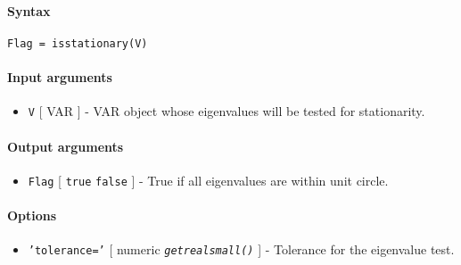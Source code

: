 


	\paragraph{Syntax}

\begin{verbatim}
Flag = isstationary(V)
\end{verbatim}

\paragraph{Input arguments}

\begin{itemize}
\itemsep1pt\parskip0pt
\item
  \texttt{V} {[} VAR {]} - VAR object whose eigenvalues will be tested
  for stationarity.
\end{itemize}

\paragraph{Output arguments}

\begin{itemize}
\itemsep1pt\parskip0pt
\item
  \texttt{Flag} {[} \texttt{true} \textbar{} \texttt{false} {]} - True
  if all eigenvalues are within unit circle.
\end{itemize}

\paragraph{Options}

\begin{itemize}
\itemsep1pt\parskip0pt
\item
  \texttt{'tolerance='} {[} numeric \textbar{}
  \emph{\texttt{getrealsmall()}} {]} - Tolerance for the eigenvalue
  test.
\end{itemize}


